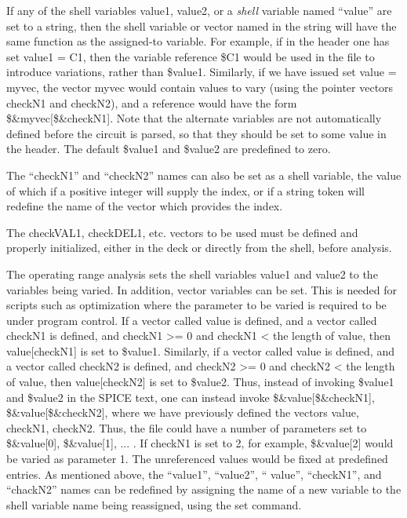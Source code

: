 If any of the shell variables {\et value1}, {\et value2}, or a {\it
shell} variable named ``{\et value}'' are set to a string, then the
shell variable or vector named in the string will have the same
function as the assigned-to variable.  For example, if in the header
one has {\vt set value1 = C1}, then the variable reference {\vt \$C1}
would be used in the file to introduce variations, rather than {\vt
\$value1}.  Similarly, if we have issued {\vt set value = myvec}, the
vector {\et myvec} would contain values to vary (using the pointer
vectors {\et checkN1} and {\et checkN2}), and a reference would have
the form {\vt \$\&myvec[\$\&checkN1]}.  Note that the alternate
variables are not automatically defined before the circuit is parsed,
so that they should be set to some value in the header.  The default
{\vt \$value1} and {\vt \$value2} are predefined to zero.

The ``checkN1'' and ``checkN2'' names can also be set as a shell
variable, the value of which if a positive integer will supply the
index, or if a string token will redefine the name of the vector which
provides the index.

The {\et checkVAL1}, {\et checkDEL1}, etc. vectors to be used must be
defined and properly initialized, either in the deck or directly from
the shell, before analysis.

The operating range analysis sets the shell variables {\et value1} and
{\et value2} to the variables being varied.  In addition, vector
variables can be set.  This is needed for scripts such as optimization
where the parameter to be varied is required to be under program
control.  If a vector called {\et value} is defined, and a vector
called {\et checkN1} is defined, and {\vt checkN1 >= 0} and {\vt
checkN1 <} the length of {\et value}, then {\vt value[checkN1]} is set
to {\vt \$value1}.  Similarly, if a vector called {\et value} is
defined, and a vector called {\et checkN2} is defined, and {\vt
checkN2 >= 0} and {\vt checkN2 <} the length of {\et value}, then {\vt
value[checkN2]} is set to {\vt \$value2}.  Thus, instead of invoking
{\vt \$value1} and {\vt \$value2} in the SPICE text, one can instead
invoke {\vt \$\&value[\$\&checkN1], \$\&value[\$\&checkN2]}, where we
have previously defined the vectors {\et value}, {\et checkN1}, {\et
checkN2}.  Thus, the file could have a number of parameters set to
{\vt \$\&value[0], \$\&value[1], ...} .  If {\et checkN1} is set to 2,
for example, {\vt \$\&value[2]} would be varied as parameter 1.  The
unreferenced values would be fixed at predefined entries.  As
mentioned above, the ``{\et value1}'', ``{\et value2}'', ``{\et
value}'', ``{\et checkN1}'', and ``{\et chackN2}'' names can be
redefined by assigning the name of a new variable to the shell
variable name being reassigned, using the {\cb set} command.

